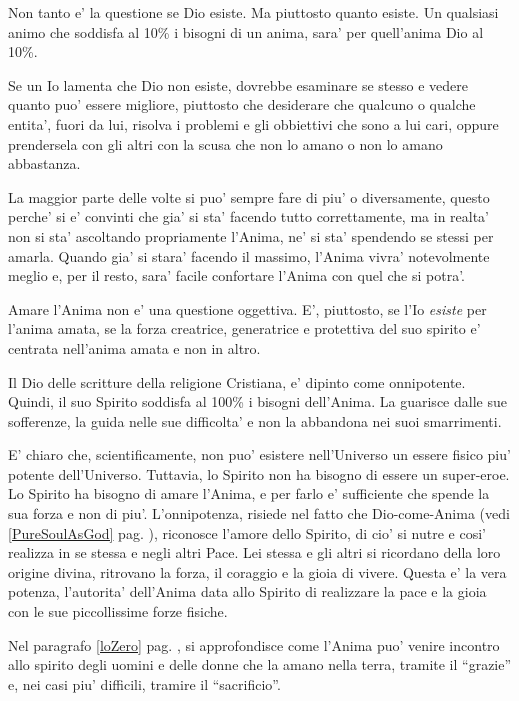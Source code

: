    Non tanto e' la questione se Dio esiste. Ma piuttosto quanto esiste. Un qualsiasi animo che soddisfa al 10\% i bisogni di un anima, sara' per quell'anima Dio al 10\%.

   Se un Io lamenta che Dio non esiste, dovrebbe esaminare se stesso e vedere quanto puo' essere migliore, piuttosto che desiderare che qualcuno o qualche entita', fuori da lui, risolva i problemi e gli obbiettivi che sono a lui cari, oppure prendersela con gli altri con la scusa che non lo amano o non lo amano abbastanza.

    La maggior parte delle volte si puo' sempre fare di piu' o diversamente, questo perche' si e' convinti che gia' si sta' facendo tutto correttamente, ma in realta' non si sta' ascoltando propriamente l'Anima, ne' si sta' spendendo se stessi per amarla. Quando gia' si stara' facendo il massimo, l'Anima vivra' notevolmente meglio e, per il resto, sara' facile confortare l'Anima con quel che si potra'.

    Amare l'Anima non e' una questione oggettiva. E', piuttosto, se l'Io \emph{esiste} per l'anima amata, se la forza creatrice, generatrice e protettiva del suo spirito e' centrata nell'anima amata e non in altro. 

    Il Dio delle scritture della religione Cristiana, e' dipinto come onnipotente. Quindi, il suo Spirito soddisfa al 100\% i bisogni dell'Anima. La guarisce dalle sue sofferenze, la guida nelle sue difficolta' e non la abbandona nei suoi smarrimenti.

    E' chiaro che, scientificamente, non puo' esistere nell'Universo un essere fisico piu' potente dell'Universo. Tuttavia, lo Spirito non ha bisogno di essere un super-eroe. Lo Spirito ha bisogno di amare l'Anima, e per farlo e' sufficiente che spende la sua forza e non di piu'. L'onnipotenza, risiede nel fatto che Dio-come-Anima (vedi \ref{PureSoulAsGod} pag. \pageref{PureSoulAsGod}), riconosce l'amore dello Spirito, di cio' si nutre e cosi' realizza in se stessa e negli altri Pace. Lei stessa e gli altri si ricordano della loro origine divina, ritrovano la forza, il coraggio e la gioia di vivere.
    Questa e' la vera potenza, l'autorita' dell'Anima data allo Spirito di realizzare la pace e la gioia con le sue piccollissime forze fisiche.

 Nel paragrafo \ref{loZero} pag. \pageref{loZero}, si approfondisce come l'Anima puo' venire incontro allo spirito degli uomini e delle donne che la amano nella terra, tramite il ``grazie'' e, nei casi piu' difficili, tramire il ``sacrificio''. 

